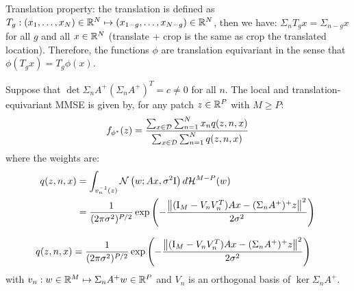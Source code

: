 \documentclass[a4paper,10pt]{article}
\begin{document}
Translation property: the translation is defined as $T_g : (x_1, \dots, x_N) \in \mathbb{R}^N \mapsto (x_{1 - g}, \dots, x_{N - g}) \in \mathbb{R}^N$, then we have: $\Sigma_n T_g x = \Sigma_{n - g} x$ for all $g$ and all $x \in \mathbb{R}^N$ (translate + crop is the same as crop the translated location). Therefore, the functions $\phi$ are translation equivariant in the sense that $\phi(T_g x) = T_g \phi(x)$.
\begin{proposition}
    Suppose that $\det{\Sigma_n A^+ (\Sigma_n A^+)^T} = c \neq 0$ for all $n$.
    The local and translation-equivariant MMSE is given by, for any patch $z \in \mathbb{R}^P$ with $M \geqslant P$: 
    \begin{equation*}
        f_{\phi^*}(z) = \frac{\sum_{x \in \mathcal{D}} \sum_{n = 1}^{N} x_n q(z, n, x)}{\sum_{x \in \mathcal{D}} \sum_{n = 1}^{N} q(z, n, x)}
    \end{equation*}
    where the weights are: 
    \begin{align*}
        q(z, n, x) &= \int_{v_n^{-1}(z)} \mathcal{N}\left( {w; A x, \sigma^2 \mathrm{I}} \right) d \mathcal{H}^{M - P}(w) 
        \\&= \frac{1}{(2\pi \sigma^2)^{P/2}} \exp \left( -\frac{\left\| (\mathrm{I}_M - V_n V_n^T)A x - (\Sigma_n A^+)^+ z \right \|^2}{2\sigma^2} \right)
    \end{align*}

    \begin{align*}
        q(z, n, x) &= \frac{1}{(2\pi \sigma^2)^{P/2}} \exp \left( -\frac{\left\| (\mathrm{I}_M - V_n V_n^T)A x - (\Sigma_n A^+)^+ z \right \|^2}{2\sigma^2} \right)
    \end{align*}
    with $v_n: w \in \mathbb{R}^M \mapsto \Sigma_n A^+ w \in \mathbb{R}^P$ and $V_n$ is an orthogonal basis of $\ker{\Sigma_n A^+}$.
\end{proposition}
\end{document}
